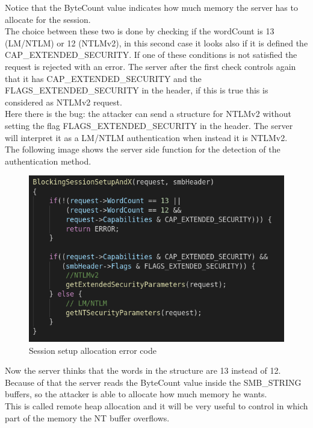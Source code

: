 \noindent Notice that the ByteCount value indicates how much memory the server has to allocate for the session.\\
\noindent The choice between these two is done by checking 
if the wordCount is 13 (LM/NTLM) or 12 (NTLMv2), in this second case it looks also if it is defined the 
CAP\_EXTENDED\_SECURITY. If one of these conditions is not satisfied the request is rejected with an error.
The server after the first check controls again that it has CAP\_EXTENDED\_SECURITY and the
FLAGS\_EXTENDED\_SECURITY in the header, if this is true this is considered as NTLMv2 request.\\
\noindent Here there is the bug: the attacker can send a structure for NTLMv2 without setting the flag FLAGS\_EXTENDED\_SECURITY in the 
header. The server will interpret it as a LM/NTLM authentication when instead it is NTLMv2.\\
The following image shows the server side function for the detection of the authentication method.

\begin{figure}[ht!]
  \centering
    \includegraphics[scale=0.35]{images/auth_vuln_code.png}
    \caption{Session setup allocation error code}
\end{figure}

\noindent Now the server thinks that the words in the structure are 13 instead of 12. Because of that the server reads the ByteCount value inside the 
SMB\_STRING buffers, so the attacker is able to allocate how much memory he wants. \\
This is called remote heap allocation and it will be very useful to control in which part of the memory the NT buffer overflows.